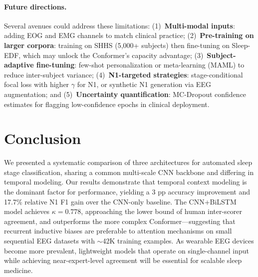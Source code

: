 \documentclass[final]{article}
\begin{document}
\paragraph{Future directions.}
Several avenues could address these limitations: (1)~\textbf{Multi-modal inputs}: adding EOG and EMG channels to match clinical practice; (2)~\textbf{Pre-training on larger corpora}: training on SHHS (5,000+ subjects) then fine-tuning on Sleep-EDF, which may unlock the Conformer's capacity advantage; (3)~\textbf{Subject-adaptive fine-tuning}: few-shot personalization or meta-learning (MAML) to reduce inter-subject variance; (4)~\textbf{N1-targeted strategies}: stage-conditional focal loss with higher $\gamma$ for N1, or synthetic N1 generation via EEG augmentation; and (5)~\textbf{Uncertainty quantification}: MC-Dropout confidence estimates for flagging low-confidence epochs in clinical deployment.

\section{Conclusion}

We presented a systematic comparison of three architectures for automated sleep stage classification, sharing a common multi-scale CNN backbone and differing in temporal modeling. Our results demonstrate that temporal context modeling is the dominant factor for performance, yielding a 3 pp accuracy improvement and 17.7\% relative N1 F1 gain over the CNN-only baseline. The CNN+BiLSTM model achieves $\kappa = 0.778$, approaching the lower bound of human inter-scorer agreement, and outperforms the more complex Conformer---suggesting that recurrent inductive biases are preferable to attention mechanisms on small sequential EEG datasets with $\sim$42K training examples. As wearable EEG devices become more prevalent, lightweight models that operate on single-channel input while achieving near-expert-level agreement will be essential for scalable sleep medicine.



\end{document}
